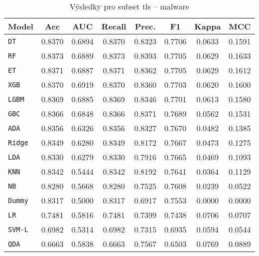 \begin{table}[H]
  \centering
  \small
  \caption{Výsledky pro subset tls – malware}
  \begin{tabular}{|l|c|c|c|c|c|c|c|}
    \hline
    \textbf{Model} & \textbf{Acc} & \textbf{AUC} & \textbf{Recall} & \textbf{Prec.} & \textbf{F1} & \textbf{Kappa} & \textbf{MCC} \\
    \hline
    \texttt{DT} & 0.8370 & 0.6894 & 0.8370 & 0.8323 & 0.7706 & 0.0633 & 0.1591 \\
    \texttt{RF} & 0.8373 & 0.6889 & 0.8373 & 0.8393 & 0.7705 & 0.0629 & 0.1633 \\
    \texttt{ET} & 0.8371 & 0.6887 & 0.8371 & 0.8362 & 0.7705 & 0.0629 & 0.1612 \\
    \texttt{XGB} & 0.8370 & 0.6919 & 0.8370 & 0.8360 & 0.7703 & 0.0620 & 0.1600 \\
    \texttt{LGBM} & 0.8369 & 0.6885 & 0.8369 & 0.8346 & 0.7701 & 0.0613 & 0.1580 \\
    \texttt{GBC} & 0.8366 & 0.6848 & 0.8366 & 0.8371 & 0.7689 & 0.0562 & 0.1531 \\
    \texttt{ADA} & 0.8356 & 0.6326 & 0.8356 & 0.8327 & 0.7670 & 0.0482 & 0.1385 \\
    \texttt{Ridge} & 0.8349 & 0.6280 & 0.8349 & 0.8172 & 0.7667 & 0.0473 & 0.1275 \\
    \texttt{LDA} & 0.8330 & 0.6279 & 0.8330 & 0.7916 & 0.7665 & 0.0469 & 0.1093 \\
    \texttt{KNN} & 0.8342 & 0.5444 & 0.8342 & 0.8192 & 0.7641 & 0.0364 & 0.1129 \\
    \texttt{NB} & 0.8280 & 0.5668 & 0.8280 & 0.7525 & 0.7608 & 0.0239 & 0.0522 \\
    \texttt{Dummy} & 0.8317 & 0.5000 & 0.8317 & 0.6917 & 0.7553 & 0.0000 & 0.0000 \\
    \texttt{LR} & 0.7481 & 0.5816 & 0.7481 & 0.7399 & 0.7438 & 0.0706 & 0.0707 \\
    \texttt{SVM-L} & 0.6982 & 0.5314 & 0.6982 & 0.7315 & 0.6935 & 0.0594 & 0.0544 \\
    \texttt{QDA} & 0.6663 & 0.5838 & 0.6663 & 0.7567 & 0.6503 & 0.0769 & 0.0889 \\
    \hline
  \end{tabular}
\end{table}
\vspace{0.5cm}

